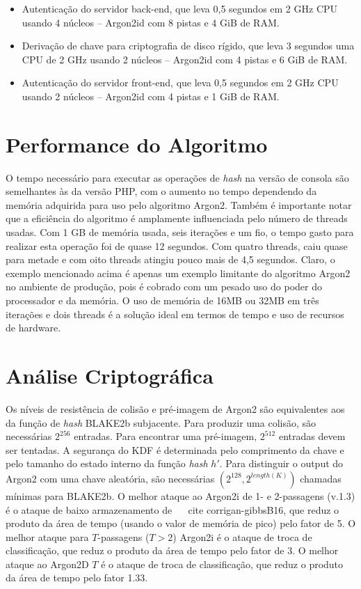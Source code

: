 \documentclass[conference]{IEEEtran}
\begin{document}
\begin{itemize}
\item Autenticação do servidor back-end, que leva 0,5 segundos em 2 GHz
CPU usando 4 núcleos -- Argon2id com 8 pistas e 4 GiB de RAM.
\item Derivação de chave para criptografia de disco rígido, que leva 3 segundos
uma CPU de 2 GHz usando 2 núcleos -- Argon2id com 4 pistas e 6 GiB de
RAM.
\item Autenticação do servidor front-end, que leva 0,5 segundos em 2 GHz
CPU usando 2 núcleos -- Argon2id com 4 pistas e 1 GiB de RAM.
\end{itemize} \cite{rfc9106}

\section{Performance do Algoritmo}

O tempo necessário para executar as operações de \textit{hash} na versão de consola são 
semelhantes às da versão PHP, com o aumento no tempo dependendo da memória 
adquirida para uso pelo algoritmo Argon2. Também é importante notar que a eficiência 
do algoritmo é amplamente influenciada pelo número de threads usadas. Com 1 GB de memória 
usada, seis iterações e um fio, o tempo gasto para realizar esta operação foi 
de quase 12 segundos. Com quatro threads, caiu quase para metade e com oito threads 
atingiu pouco mais de 4,5 segundos. Claro, o exemplo mencionado acima é apenas um exemplo 
limitante do algoritmo Argon2 no ambiente de produção, pois é cobrado com um pesado uso 
do poder do processador e da memória. O uso de memória de 16MB ou 32MB em três 
iterações e dois threads é a solução ideal em termos de tempo e uso de recursos 
de hardware. \cite{duka2020elliptic}

\section{Análise Criptográfica}

Os níveis de resistência de colisão e pré-imagem de Argon2 são equivalentes aos da função 
de \textit{hash} BLAKE2b subjacente. Para produzir uma colisão, são necessárias $2^{256}$ entradas. 
Para encontrar uma pré-imagem, $2^{512}$ entradas devem ser tentadas.
A segurança do KDF é determinada pelo comprimento da chave e pelo tamanho do estado interno 
da função \textit{hash} $h'$. Para distinguir o output do Argon2 com uma chave aleatória, são necessárias 
$(2^{128},2^{length(K)})$ chamadas mínimas para BLAKE2b.
O melhor ataque ao Argon2i de 1- e 2-passagens (v.1.3) é o ataque de baixo armazenamento 
de ~ \ cite {corrigan-gibbsB16}, que reduz o produto da área de tempo (usando o valor de 
memória de pico) pelo fator de 5. O melhor ataque para $T$-passagens ($T>2$) Argon2i é o 
ataque de troca de classificação, que reduz o produto da área de tempo pelo fator de 3.
O melhor ataque ao Argon2D $ T $  é o ataque de troca de classificação, que reduz 
o produto da área de tempo pelo fator 1.33. \cite{argon2spec}
\end{document}
